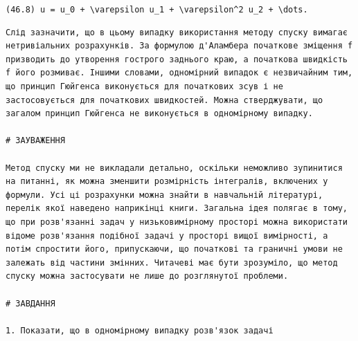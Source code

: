 \documentclass[
  ukrainian,
]{article}
\begin{document}
\texttt{(46.8)\ u\ =\ u\_0\ +\ \textbackslash{}varepsilon\ u\_1\ +\ \textbackslash{}varepsilon\^{}2\ u\_2\ +\ \textbackslash{}dots.}

\begin{verbatim}
Слід зазначити, що в цьому випадку використання методу спуску вимагає нетривіальних розрахунків. За формулою д'Аламбера початкове зміщення f призводить до утворення гострого заднього краю, а початкова швидкість f його розмиває. Іншими словами, одномірний випадок є незвичайним тим, що принцип Гюйгенса виконується для початкових зсув і не застосовується для початкових швидкостей. Можна стверджувати, що загалом принцип Гюйгенса не виконується в одномірному випадку.

# ЗАУВАЖЕННЯ

Метод спуску ми не викладали детально, оскільки неможливо зупинитися на питанні, як можна зменшити розмірність інтегралів, включених у формули. Усі ці розрахунки можна знайти в навчальній літературі, перелік якої наведено наприкінці книги. Загальна ідея полягає в тому, що при розв'язанні задач у низьковимірному просторі можна використати відоме розв'язання подібної задачі у просторі вищої вимірності, а потім спростити його, припускаючи, що початкові та граничні умови не залежать від частини змінних. Читачеві має бути зрозуміло, що метод спуску можна застосувати не лише до розглянутої проблеми.

# ЗАВДАННЯ

1. Показати, що в одномірному випадку розв'язок задачі
\end{verbatim}
\end{document}
